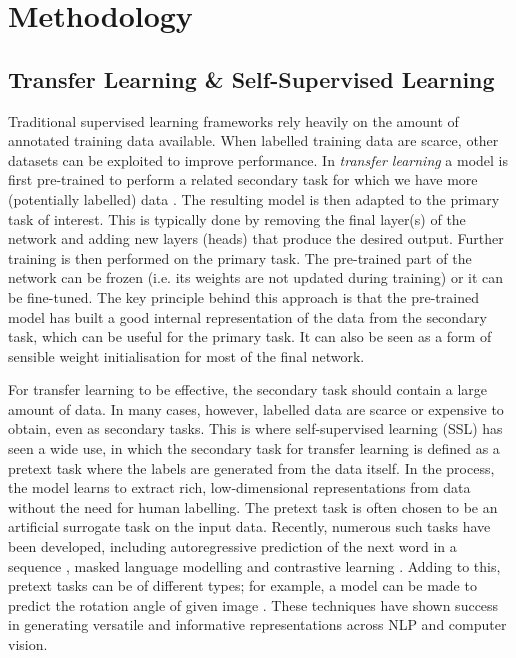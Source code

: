 \documentclass[draft, a4paper,12pt]{article}
\begin{document}
\section{Methodology}
\label{sec:methodology}
\subsection{Transfer Learning \& Self-Supervised Learning}
\label{sec:ssl}

Traditional supervised learning frameworks rely heavily on the amount of annotated training data available. When labelled training data are scarce, other datasets can be exploited to improve performance. In \emph{transfer learning} a model is first pre-trained to perform a related secondary task for which we have more (potentially labelled) data \cite{udl}. The resulting model is then adapted to the primary task of interest. This is typically done by removing the final layer(s) of the network and adding new layers (heads) that produce the desired output. Further training is then performed on the primary task. The pre-trained part of the network can be frozen (i.e. its weights are not updated during training) or it can be fine-tuned. The key principle behind this approach is that the pre-trained model has built a good internal representation of the data from the secondary task, which can be useful for the primary task. It can also be seen as a form of sensible weight initialisation for most of the final network.

For transfer learning to be effective, the secondary task should contain a large amount of data. In many cases, however, labelled data are scarce or expensive to obtain, even as secondary tasks. This is where self-supervised learning (SSL) has seen a wide use, in which the secondary task for transfer learning is defined as a  pretext task where the labels are generated from the data itself. In the process, the model learns to extract rich, low-dimensional representations from data without the need for human labelling. The pretext task is often chosen to be an artificial surrogate task on the input data. Recently, numerous such tasks have been developed, including autoregressive prediction of the next word in a sequence \cite{radford2019language}, masked language modelling \cite{devlin2018bert} and contrastive learning \cite{radford2021learning}. Adding to this, pretext tasks can be of different types; for example,  a model can be made to predict the rotation angle of given image \cite{hintonsimpleframework}. These techniques have shown success in generating versatile and informative representations across NLP and computer vision.
\end{document}
